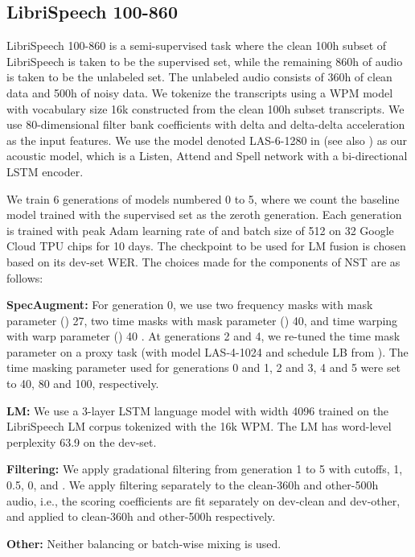 \documentclass[a4paper]{article}
\begin{document}
\subsection{LibriSpeech 100-860}
\label{s:100-860}
LibriSpeech 100-860 is a semi-supervised task where the clean 100h subset of LibriSpeech \cite{librispeech} is taken to be the supervised set, while the remaining 860h of audio is taken to be the unlabeled set. The unlabeled audio consists of 360h of clean data and 500h of noisy data. We tokenize the transcripts using a WPM model \cite{wpm} with vocabulary size 16k constructed from the clean 100h subset transcripts. We use 80-dimensional filter bank coefficients with delta and delta-delta acceleration as the input features. We use the model denoted LAS-6-1280 in \cite{specaugment} (see also \cite{lasbaseline}) as our acoustic model, which is a Listen, Attend and Spell network \cite{LAS} with a bi-directional LSTM encoder.

We train 6 generations of models numbered 0 to 5, where we count the baseline model trained with the supervised set as the zeroth generation. Each generation is trained with peak Adam learning rate of  and batch size of 512 on 32 Google Cloud TPU chips for 10 days. The checkpoint to be used for LM fusion is chosen based on its dev-set WER. The choices made for the components of NST are as follows:

\noindent\textbf{SpecAugment:} For generation 0, we use two frequency masks with mask parameter () 27, two time masks with mask parameter () 40, and time warping with warp parameter () 40 \cite{specaugment}. At generations 2 and 4, we re-tuned the time mask parameter  on a proxy task (with model LAS-4-1024 and schedule LB from \cite{specaugment}). The time masking parameter used for generations 0 and 1, 2 and 3, 4 and 5 were set to 40, 80 and 100, respectively.

\noindent\textbf{LM:} We use a 3-layer LSTM language model with width 4096 trained on the LibriSpeech LM corpus tokenized with the 16k WPM. The LM has word-level perplexity 63.9 on the dev-set.

\noindent\textbf{Filtering:} We apply gradational filtering from generation 1 to 5 with cutoffs, 1, 0.5, 0,  and . We apply filtering separately to the clean-360h and other-500h audio, i.e., the scoring coefficients are fit separately on dev-clean and dev-other, and applied to clean-360h and other-500h respectively.

\noindent\textbf{Other:} Neither balancing or batch-wise mixing is used.
\end{document}
